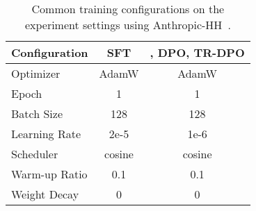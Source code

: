 \begin{table*}[h]
    \centering
    \begin{tabular}{lcc}
        \toprule
        \textbf{Configuration} & \textbf{SFT} & \textbf{\methodb{}}, \textbf{DPO}, \textbf{TR-DPO} \\ 
        \midrule
        Optimizer & AdamW & AdamW \\
        Epoch & 1 & 1 \\
        Batch Size & 128 & 128 \\
        Learning Rate & 2e-5 & 1e-6 \\
        Scheduler & cosine & cosine \\
        Warm-up Ratio & 0.1 & 0.1 \\
        Weight Decay & 0 & 0 \\
        \bottomrule
    \end{tabular}
    \caption{Common training configurations on the experiment settings using Anthropic-HH~\cite{bai2022training}.}
    \label{tables:anthropic_hh}
\end{table*}